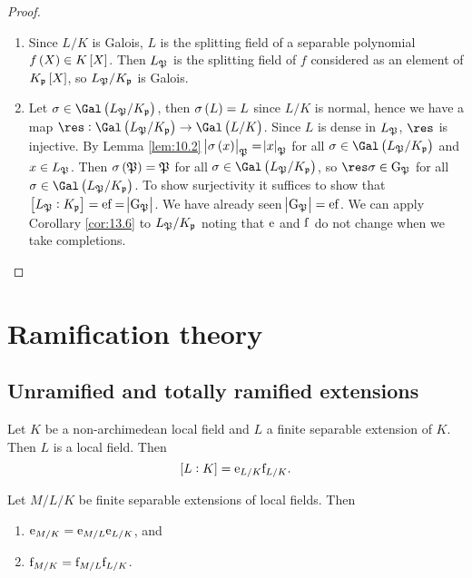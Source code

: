 \begin{proof}
\hfill
\begin{enumerate}
\item Since $ L / K $ is Galois, $ L $ is the splitting field of a separable polynomial $ f\br{X} \in K\sbr{X} $. Then $ L_{\mathfrak{P}} $ is the splitting field of $ f $ considered as an element of $ K_\ppp\sbr{X} $, so $ L_{\mathfrak{P}} / K_{\mathfrak{p}} $ is Galois.
\item Let $ \sigma \in \Gal\br{L_\pp / K_\ppp} $, then $ \sigma\br{L} = L $ since $ L / K $ is normal, hence we have a map $ \res : \Gal\br{L_\pp / K_\ppp} \to \Gal\br{L / K} $. Since $ L $ is dense in $ L_{\mathfrak{P}} $, $ \res $ is injective. By Lemma \ref{lem:10.2} $ \abs{\sigma\br{x}}_\pp = \abs{x}_\pp $ for all $ \sigma \in \Gal\br{L_\pp / K_\ppp} $ and $ x \in L_{\mathfrak{P}} $. Then $ \sigma\br{\pp} = \pp $ for all $ \sigma \in \Gal\br{L_\pp / K_\ppp} $, so $ \res \sigma \in \G_\pp $ for all $ \sigma \in \Gal\br{L_\pp / K_\ppp} $. To show surjectivity it suffices to show that $ \sbr{L_\pp : K_\ppp} = \e\f = \abs{\G_\pp} $. We have already seen $ \abs{\mathrm{G}_{\mathfrak{P}}} = \mathrm{e}\mathrm{f} $. We can apply Corollary \ref{cor:13.6} to $ L_{\mathfrak{P}} / K_{\mathfrak{p}} $ noting that $ \mathrm{e} $ and $ \mathrm{f} $ do not change when we take completions.
\end{enumerate}
\end{proof}

\pagebreak

\section{Ramification theory}

\subsection{Unramified and totally ramified extensions}


Let $ K $ be a non-archimedean local field and $ L $ a finite separable extension of $ K $. Then $ L $ is a local field. Then
\begin{equation}
\label{eq:5}
\sbr{L : K} = \e_{L / K}\f_{L / K}.
\end{equation}

\begin{lemma}
Let $ M / L / K $ be finite separable extensions of local fields. Then
\begin{enumerate}
\item $ \mathrm{e}_{M / K} = \mathrm{e}_{M / L}\mathrm{e}_{L / K} $, and
\item $ \mathrm{f}_{M / K} = \mathrm{f}_{M / L}\mathrm{f}_{L / K} $.
\end{enumerate}
\end{lemma}

